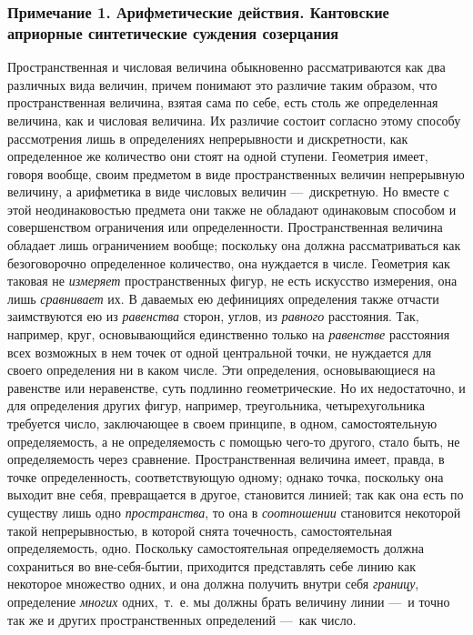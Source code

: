 \subsubsection[Примечание 1. Арифметические действия. Кантовские априорные синтетические суждения созерцания]
{Примечание 1. Арифметические действия. Кантовские априорные синтетические суждения созерцания}

Пространственная и числовая величина обыкновенно рассматриваются как два
различных вида величин, причем понимают это различие таким образом, что
пространственная величина, взятая сама по себе, есть столь же определенная
величина, как и числовая величина. Их различие состоит согласно этому
способу рассмотрения лишь в определениях непрерывности и дискретности, как
определенное же количество они стоят на одной ступени. Геометрия имеет,
говоря вообще, своим предметом в виде пространственных величин непрерывную
величину, а арифметика в виде числовых величин —~дискретную. Но вместе с
этой неодинаковостью предмета они также не обладают одинаковым способом и
совершенством ограничения или определенности. Пространственная величина
обладает лишь ограничением вообще; поскольку она должна рассматриваться как
безоговорочно определенное количество, она нуждается в числе. Геометрия как
таковая не {\em измеряет} пространственных фигур, не
есть искусство измерения, она лишь {\em сравнивает} их.
В даваемых ею дефинициях определения также отчасти заимствуются ею из
{\em равенства} сторон, углов, из
{\em равного} расстояния. Так, например, круг,
основывающийся единственно только на {\em равенстве}
расстояния всех возможных в нем точек от одной центральной точки, не
нуждается для своего определения ни в каком числе. Эти определения,
основывающиеся на равенстве или неравенстве, суть подлинно геометрические.
Но их недостаточно, и для определения других фигур, например, треугольника,
четырехугольника требуется число, заключающее в своем принципе, в одном,
самостоятельную определяемость, а не определяемость с помощью чего-то
другого, стало быть, не определяемость через сравнение. Пространственная
величина имеет, правда, в точке определенность, соответствующую одному;
однако точка, поскольку она выходит вне себя, превращается в другое,
становится линией; так как она есть по существу лишь одно
{\em пространства}, то она в
{\em соотношении} становится некоторой такой
непрерывностью, в которой снята точечность, самостоятельная определяемость,
одно. Поскольку самостоятельная определяемость должна сохраниться во
вне-себя-бытии, приходится представлять себе линию как некоторое множество
одних, и она должна получить внутри себя {\em границу},
определение {\em многих} одних,~т.~е. мы должны брать
величину линии —~и точно так же и других пространственных определений —~как
число.

